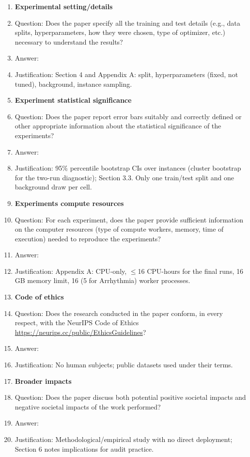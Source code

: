 \begin{enumerate}
\item {\bf Experimental setting/details}
 \item[] Question: Does the paper specify all the training and test details (e.g., data splits, hyperparameters, how they were chosen, type of optimizer, etc.) necessary to understand the results?
 \item[] Answer: \answerYes{}
 \item[] Justification: Section 4 and Appendix A: split, hyperparameters (fixed, not tuned), background, instance sampling.

\item {\bf Experiment statistical significance}
 \item[] Question: Does the paper report error bars suitably and correctly defined or other appropriate information about the statistical significance of the experiments?
 \item[] Answer: \answerYes{}
 \item[] Justification: 95\% percentile bootstrap CIs over instances (cluster bootstrap for the two-run diagnostic); Section 3.3. Only one train/test split and one background draw per cell.

\item {\bf Experiments compute resources}
 \item[] Question: For each experiment, does the paper provide sufficient information on the computer resources (type of compute workers, memory, time of execution) needed to reproduce the experiments?
 \item[] Answer: \answerYes{}
 \item[] Justification: Appendix A: CPU-only, $\le$16 CPU-hours for the final runs, 16 GB memory limit, 16 (5 for Arrhythmia) worker processes.

\item {\bf Code of ethics}
 \item[] Question: Does the research conducted in the paper conform, in every respect, with the NeurIPS Code of Ethics \url{https://neurips.cc/public/EthicsGuidelines}?
 \item[] Answer: \answerYes{}
 \item[] Justification: No human subjects; public datasets used under their terms.

\item {\bf Broader impacts}
 \item[] Question: Does the paper discuss both potential positive societal impacts and negative societal impacts of the work performed?
 \item[] Answer: \answerNA{}
 \item[] Justification: Methodological/empirical study with no direct deployment; Section 6 notes implications for audit practice.


\end{enumerate}
